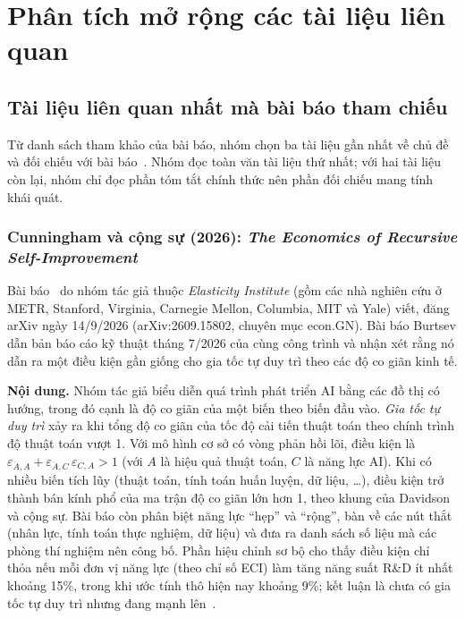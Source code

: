 \documentclass[12pt,a4paper,openany]{report}
\numberwithin{equation}{chapter}   %
\theoremstyle{definition}
\newcommand{\en}[1]{\textit{#1}}   %
\begin{document}
\chapter{Phân tích mở rộng các tài liệu liên quan}\label{ch:morong}
\section{Tài liệu liên quan nhất mà bài báo tham chiếu}\label{sec:cited}
Từ danh sách tham khảo của bài báo, nhóm chọn ba tài liệu gần nhất về chủ đề và đối chiếu với bài báo~\cite{burtsev2026}. Nhóm đọc toàn văn tài liệu thứ nhất; với hai tài liệu còn lại, nhóm chỉ đọc phần tóm tắt chính thức nên phần đối chiếu mang tính khái quát.

\subsection{Cunningham và cộng sự (2026): \en{The Economics of Recursive Self-Improvement}}
Bài báo~\cite{cunningham2026} do nhóm tác giả thuộc \en{Elasticity Institute} (gồm các nhà nghiên cứu ở METR, Stanford, Virginia, Carnegie Mellon, Columbia, MIT và Yale) viết, đăng arXiv ngày 14/9/2026 (arXiv:2609.15802, chuyên mục econ.GN). Bài báo Burtsev dẫn bản báo cáo kỹ thuật tháng 7/2026 của cùng công trình và nhận xét rằng nó dẫn ra một điều kiện gần giống cho gia tốc tự duy trì theo các độ co giãn kinh tế.

\textbf{Nội dung.} Nhóm tác giả biểu diễn quá trình phát triển AI bằng các đồ thị có hướng, trong đó cạnh là độ co giãn của một biến theo biến đầu vào. \emph{Gia tốc tự duy trì} xảy ra khi tổng độ co giãn của tốc độ cải tiến thuật toán theo chính trình độ thuật toán vượt 1. Với mô hình cơ sở có vòng phản hồi lõi, điều kiện là $\varepsilon_{\dot A,A}+\varepsilon_{\dot A,C}\,\varepsilon_{C,A}>1$ (với $A$ là hiệu quả thuật toán, $C$ là năng lực AI). Khi có nhiều biến tích lũy (thuật toán, tính toán huấn luyện, dữ liệu, \dots), điều kiện trở thành bán kính phổ của ma trận độ co giãn lớn hơn 1, theo khung của Davidson và cộng sự. Bài báo còn phân biệt năng lực ``hẹp'' và ``rộng'', bàn về các nút thắt (nhân lực, tính toán thực nghiệm, dữ liệu) và đưa ra danh sách số liệu mà các phòng thí nghiệm nên công bố. Phần hiệu chỉnh sơ bộ cho thấy điều kiện chỉ thỏa nếu mỗi đơn vị năng lực (theo chỉ số ECI) làm tăng năng suất R\&D ít nhất khoảng 15\%, trong khi ước tính thô hiện nay khoảng 9\%; kết luận là chưa có gia tốc tự duy trì nhưng đang mạnh lên~\cite{cunningham2026}.
\end{document}
